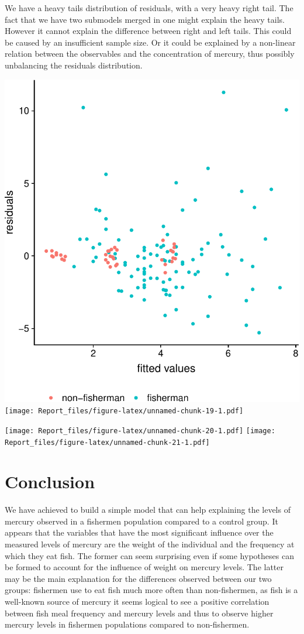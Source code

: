 \documentclass[12pt,]{article}
\begin{document}
We have a heavy tails distribution of residuals, with a very heavy right
tail. The fact that we have two submodels merged in one might explain
the heavy tails. However it cannot explain the difference between right
and left tails. This could be caused by an insufficient sample size. Or
it could be explained by a non-linear relation between the observables
and the concentration of mercury, thus possibly unbalancing the
residuals distribution.

\includegraphics{Report_files/figure-latex/unnamed-chunk-18-1.pdf}
\texttt{[image: Report\_files/figure-latex/unnamed-chunk-19-1.pdf]}

\texttt{[image: Report\_files/figure-latex/unnamed-chunk-20-1.pdf]}
\texttt{[image: Report\_files/figure-latex/unnamed-chunk-21-1.pdf]}

\section{Conclusion}\label{conclusion}

We have achieved to build a simple model that can help explaining the
levels of mercury observed in a fishermen population compared to a
control group. It appears that the variables that have the most
significant influence over the measured levels of mercury are the weight
of the individual and the frequency at which they eat fish. The former
can seem surprising even if some hypotheses can be formed to account for
the influence of weight on mercury levels. The latter may be the main
explanation for the differences observed between our two groups:
fishermen use to eat fish much more often than non-fishermen, as fish is
a well-known source of mercury it seems logical to see a positive
correlation between fish meal frequency and mercury levels and thus to
observe higher mercury levels in fishermen populations compared to
non-fishermen.
\end{document}
